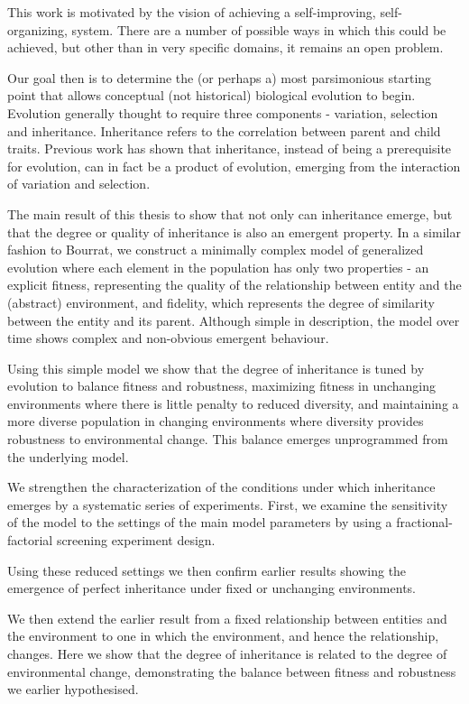 \documentclass[]{report}
\title{}
\author{}
\begin{document}
This work is motivated by the vision of achieving a self-improving, self-organizing, system.
There are a number of possible ways in which this could be achieved, but other than in very specific domains, it remains an open problem.

Our goal then is to determine the (or perhaps a) most parsimonious starting point that allows conceptual (not historical) biological evolution to begin.
Evolution generally thought to require three components - variation, selection and inheritance. Inheritance refers to the correlation between parent and child traits. Previous work has shown that inheritance, instead of being a prerequisite for evolution, can in fact be a product of evolution, emerging from the interaction of variation and selection.

The main result of this thesis to show that not only can inheritance emerge, but that the degree or quality of inheritance is also an emergent property. In a similar fashion to Bourrat, we construct a minimally complex model of generalized evolution where each element in the population has only two properties - an explicit fitness, representing the quality of the relationship between entity and the (abstract) environment, and fidelity, which represents the degree of similarity between the entity and its parent. Although simple in description, the model over time shows complex and non-obvious emergent behaviour.

Using this simple model we show that the degree of inheritance is tuned by evolution to balance fitness and robustness, maximizing fitness in unchanging environments where there is little penalty to reduced diversity, and maintaining a more diverse population in changing environments where diversity provides robustness to environmental change. This balance emerges unprogrammed from the underlying model.

We strengthen the characterization of the conditions under which inheritance emerges by a systematic series of experiments. First, we examine the sensitivity of the model to the settings of the main model parameters by using a fractional-factorial screening experiment design.

Using these reduced settings we then confirm earlier results showing the emergence of perfect inheritance under fixed or unchanging environments.

We then extend the earlier result from a fixed relationship between entities and the environment to one in which the environment, and hence the relationship, changes. Here we show that the degree of inheritance is related to the degree of environmental change, demonstrating the balance between fitness and robustness we earlier hypothesised.
\end{document}
